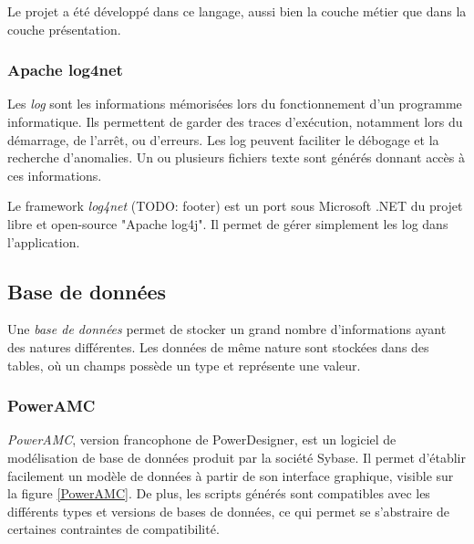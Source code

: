 Le projet a été développé dans ce langage, aussi bien la couche métier que dans la couche présentation.


\subsubsection{Apache log4net}


Les \textit{log} sont les informations mémorisées lors du fonctionnement d'un programme informatique. Ils permettent de garder des traces d'exécution, notamment lors du démarrage, de l'arrêt, ou d'erreurs. Les log peuvent faciliter le débogage et la recherche d'anomalies. Un ou plusieurs fichiers texte sont générés donnant accès à ces informations.

Le framework \textit{log4net} (TODO: footer) est un port sous Microsoft .NET du projet libre et open-source "Apache log4j". Il permet de gérer simplement les log dans l'application.


\subsection{Base de données}

Une \textit{base de données} permet de stocker un grand nombre d'informations ayant des natures différentes. Les données de même nature sont stockées dans des tables, où un champs possède un type et représente une valeur.


\subsubsection{PowerAMC}

\textit{PowerAMC}, version francophone de PowerDesigner, est un logiciel de modélisation de base de données produit par la société Sybase. Il permet d'établir facilement un modèle de données à partir de son interface graphique, visible sur la figure \ref{PowerAMC}. De plus, les scripts générés sont compatibles avec les différents types et versions de bases de données, ce qui permet se s'abstraire de certaines contraintes de compatibilité.

